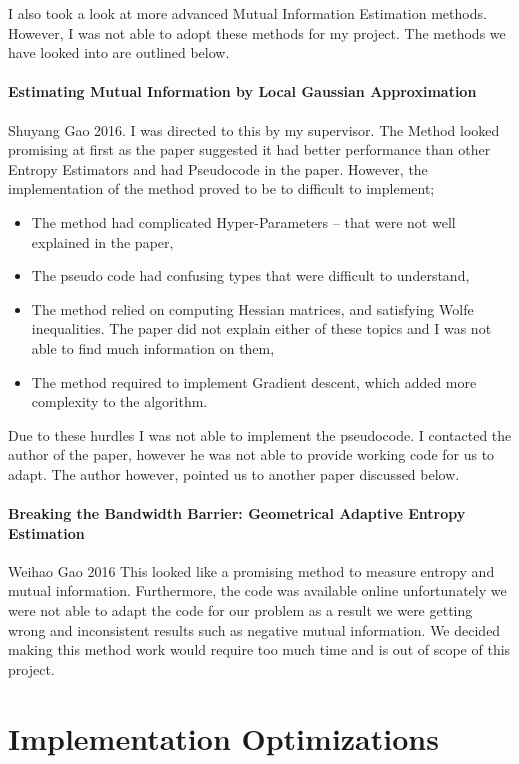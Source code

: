 \documentclass[dissertation.tex]{subfiles}
\begin{document}
I also took a look at more advanced Mutual Information Estimation methods.
However, I was not able to adopt these methods for my project. The methods we
have looked into are outlined below.

\paragraph{Estimating Mutual Information by Local Gaussian Approximation}
Shuyang Gao 2016\cite{SGAO}. I was directed to this by my supervisor. The Method
looked promising at first as the paper suggested it had better performance than
other Entropy Estimators and had Pseudocode in the paper. However, the
implementation of the method proved to be to difficult to implement; 
\begin{itemize}
  \item{
      The method had complicated Hyper-Parameters -- that were not well
      explained in the paper,
    }
  \item{
      The pseudo code had confusing types that were difficult to understand,
    }
  \item{
      The method relied on computing Hessian matrices, and satisfying Wolfe
      inequalities. The paper did not explain either of these topics and I was
      not able to find much information on them,
    }
  \item{
      The method required to implement Gradient descent, which added more
      complexity to the algorithm.
    }
\end{itemize}
Due to these hurdles I was not able to implement the pseudocode. I contacted the
author of the paper, however he was not able to provide working code for us to
adapt. The author however, pointed us to another paper discussed below.

\paragraph{Breaking the Bandwidth Barrier: Geometrical Adaptive Entropy
Estimation} Weihao Gao 2016\cite{WGAO} This looked like a promising method to
measure entropy and mutual information.  Furthermore, the code was available
online unfortunately we were not able to adapt the code for our problem as a
result we were getting wrong and inconsistent results such as negative mutual
information.  We decided making this method work would require too much time and
is out of scope of this project.

\section{Implementation Optimizations}
\end{document}

